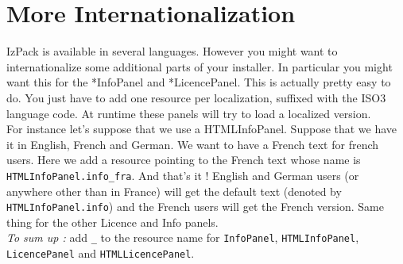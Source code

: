 \section{More Internationalization}

IzPack is available in several languages. However you might want to
internationalize some additional parts of your installer. In particular you
might want this for the *InfoPanel and *LicencePanel. This is actually pretty
easy to do. You just have to add one resource per localization, suffixed with the
ISO3 language code. At runtime these panels will try to load a localized version.\\

For instance let's suppose that we use a HTMLInfoPanel. Suppose that we have it
in English, French and German. We want to have a French text for french users.
Here we add a resource pointing to the French text whose name is
\texttt{HTMLInfoPanel.info\_fra}. And that's it ! English and German users (or
anywhere other than in France) will get the default text (denoted by 
\texttt{HTMLInfoPanel.info}) and the French users will get the French version.
Same thing for the other Licence and Info panels.\\

\noindent
\textit{To sum up :} add \texttt{\_<iso3 code>} to the resource name for
\texttt{InfoPanel}, \texttt{HTMLInfoPanel}, \texttt{LicencePanel} and
\texttt{HTMLLicencePanel}.\\
